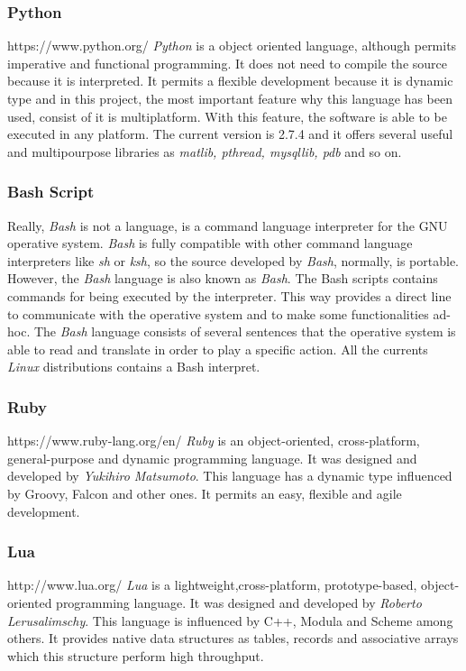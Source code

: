 \subsubsection{Python}
https://www.python.org/
\emph{Python} is a object oriented language, although permits imperative and functional
programming. It does not need to compile the source because it is
interpreted. It permits a flexible development because it is dynamic type and in
this project, the most important feature why this language has been used,
consist of it is multiplatform. With this feature, the software is able to be
executed in any platform. The current version is 2.7.4 and it offers several
useful and multipourpose libraries as \emph{matlib, pthread, mysqllib, pdb} and so on.

\subsubsection{Bash Script}

Really, \emph{Bash} is not a language, is a command language interpreter for the \ac{GNU}
operative system. \emph{Bash} is fully compatible with other command language
interpreters like \emph{sh} or \emph{ksh}, so the source developed by \emph{Bash}, normally, is
portable. 
However, the \emph{Bash} language is also known as \emph{Bash}. The Bash scripts contains
commands for being executed by the interpreter. This way provides a direct line
to communicate with the operative system and to make some functionalities ad-hoc.
The \emph{Bash} language consists of several sentences that the operative system is
able to read and translate in order to play a specific action. All the currents
\emph{Linux} distributions contains a Bash interpret. 

\subsubsection{Ruby}
https://www.ruby-lang.org/en/
\emph{Ruby} is an object-oriented, cross-platform, general-purpose and dynamic
programming language. It was designed and developed by \emph{Yukihiro
  Matsumoto}. This language has a dynamic type influenced by Groovy, Falcon and
other ones. It permits an easy, flexible and agile development. 


\subsubsection{Lua}
http://www.lua.org/
\emph{Lua} is a lightweight,cross-platform, prototype-based, object-oriented programming
language. It was designed and developed by \emph{Roberto Lerusalimschy}. This
language is influenced by C++, Modula and Scheme among others. It provides
native data structures as tables, records and associative arrays which this
structure perform high throughput.


